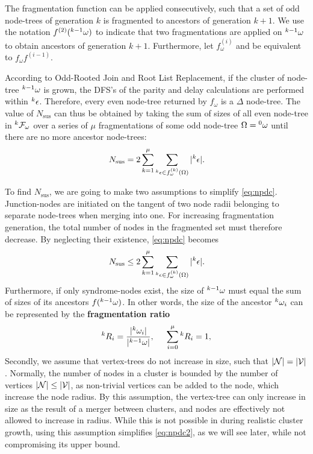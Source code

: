 The fragmentation function can be applied consecutively, such that a set of odd node-trees of generation $k$ is fragmented to ancestors of generation $k+1$. We use the notation $f^{(2)}({}^{k-1}\omega)$ to indicate that two fragmentations are applied on ${}^{k-1}\omega$ to obtain ancestors of generation $k+1$. Furthermore, let $f_\omega^{(i)}$ and be equivalent to $f_\omega f^{(i-1)}$. 

According to Odd-Rooted Join and Root List Replacement, if the cluster of node-tree ${}^{k-1}\omega$ is grown, the DFS's of the parity and delay calculations are performed within ${}^{k}\epsilon$. Therefore, every even node-tree returned by $f_\omega$ is a $\Delta$ node-tree. The value of $N_{\text{sus}}$ can thus be obtained by taking the sum of sizes of all even node-tree in ${}^{k}\mathcal{F}_\omega$ over a series of $\mu$ fragmentations of some odd node-tree $\Omega = {}^{0}\omega$ until there are no more ancestor node-trees:
\begin{equation}\label{eq:npdc}
  N_{\text{sus}} = 2\sum_{k=1}^\mu{ \sum_{ \pre{k}\epsilon \in f_\omega^{(k)}(\Omega) }{ \abs{\pre{k}\epsilon}} }.
\end{equation}

To find $N_{\text{sus}}$, we are going to make two assumptions to simplify \eqref{eq:npdc}. Junction-nodes are initiated on the tangent of two node radii belonging to separate node-trees when merging into one. For increasing fragmentation generation, the total number of nodes in the fragmented set must therefore decrease. By neglecting their existence, \eqref{eq:npdc} becomes
\begin{equation}\label{eq:npdc2}
  N_{\text{sus}} \leq 2\sum_{k=1}^\mu{ \sum_{ \pre{k}\epsilon \in f_\omega^{(k)}(\Omega) }{ \abs{\pre{k}\epsilon}} }.
\end{equation}
Furthermore, if only syndrome-nodes exist, the size of ${}^{k-1}\omega$ must equal the sum of sizes of its ancestors $f({}^{k-1}\omega)$. In other words, the size of the ancestor ${}^{k}\omega_i$ can be represented by the \textbf{fragmentation ratio}
\begin{equation}\label{eq:ratio}
  \pre{k}R_i = \frac{\abs{\pre{k}\omega_i}}{\abs{\pre{k-1}\omega}}, \hspace{0.5cm} \sum_{i=0}^{\mu}{\pre{k}R_i} = 1,
\end{equation}
Secondly, we assume that vertex-trees do not increase in size, such that $\lvert\mathcal{N}\rvert=\lvert\mathcal{V}\rvert$. Normally, the number of nodes in a cluster is bounded by the number of vertices $\lvert\mathcal{N}\rvert\leq \lvert\mathcal{V}\rvert$, as non-trivial vertices can be added to the node, which increase the node radius. By this assumption, the vertex-tree can only increase in size as the result of a merger between clusters, and nodes are effectively not allowed to increase in radius. While this is not possible in during realistic cluster growth, using this assumption simplifies \eqref{eq:npdc2}, as we will see later, while not compromising its upper bound. 

